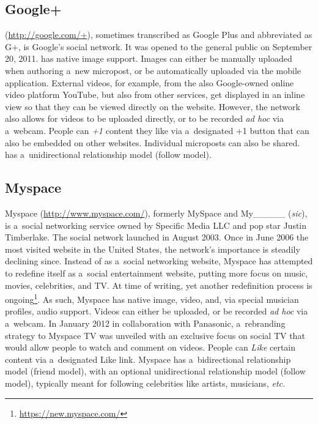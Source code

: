 \subsection{Google+}

\googleplus (\url{http://google.com/+}),
sometimes transcribed as Google Plus
and abbreviated as G+, is Google's social network.
It was opened to the general public on September 20, 2011.
\googleplus has native image support.
Images can either be manually uploaded
when authoring a~new micropost,
or be automatically uploaded via the \googleplus
mobile application.
External videos, for example, from
the also Google-owned online video platform YouTube,
but also from other services,
get displayed in an inline view
so that they can be viewed directly on the website.
However, the network also allows for
videos to be uploaded directly,
or to be recorded \emph{ad hoc} via a~webcam.
People can \emph{+1} content they like via a~designated +1 button
that can also be embedded on other websites.
Individual microposts can also be shared.
\googleplus has a~unidirectional relationship model
(follow model).

\subsection{Myspace}

Myspace (\url{http://www.myspace.com/}),
formerly MySpace and My\_\_\_\_\_ (\emph{sic}), is
a~social networking service owned by Specific Media LLC
and pop star Justin Timberlake.
The social network launched in August 2003.
Once in June 2006 the most visited website in the United States,
the network's importance is steadily declining since.
Instead of as a~social networking website,
Myspace has attempted to redefine itself
as a~social entertainment website,
putting more focus on music, movies, celebrities, and TV.
At time of writing, yet another redefinition process is
ongoing\footnote{\url{https://new.myspace.com/}}.
As such, Myspace has native image, video, and,
via special musician profiles, audio support.
Videos can either be uploaded,
or be recorded \emph{ad hoc} via a~webcam.
In January 2012 in collaboration with Panasonic,
a~rebranding strategy to Myspace TV was unveiled
with an exclusive focus on social TV that would allow people
to watch and comment on videos.
People can \emph{Like} certain content via a~designated Like link.
Myspace has a~bidirectional relationship model (friend model),
with an optional unidirectional relationship model (follow model),
typically meant for following celebrities like artists,
musicians, \emph{etc.}

